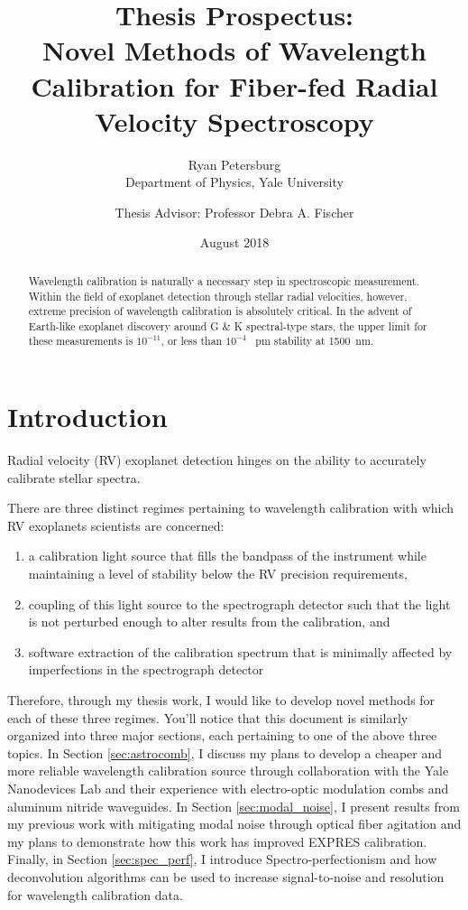 \documentclass[12pt]{article}
\title{Thesis Prospectus:\\ Novel Methods of Wavelength Calibration for Fiber-fed Radial Velocity Spectroscopy}
\author{Ryan Petersburg\\ Department of Physics, Yale University
\and Thesis Advisor: Professor Debra A. Fischer}
\date{August 2018}
\begin{document}
\maketitle

\begin{abstract}

Wavelength calibration is naturally a necessary step in spectroscopic measurement. Within the field of exoplanet detection through stellar radial velocities, however, extreme precision of wavelength calibration is absolutely critical. In the advent of Earth-like exoplanet discovery around G \& K spectral-type stars, the upper limit for these measurements is $10^{-11}$, or less than $10^{-4}$ \SI{}{\pico\meter} stability at \SI{1500}{\nano\meter}.

\end{abstract}

\pagebreak

\section{Introduction}

Radial velocity (RV) exoplanet detection hinges on the ability to accurately calibrate stellar spectra.

There are three distinct regimes pertaining to wavelength calibration with which RV exoplanets scientists are concerned:
\begin{enumerate}
    \item a calibration light source that fills the bandpass of the instrument while maintaining a level of stability below the RV precision requirements,
    \item coupling of this light source to the spectrograph detector such that the light is not perturbed enough to alter results from the calibration, and
    \item software extraction of the calibration spectrum that is minimally affected by imperfections in the spectrograph detector
\end{enumerate}

Therefore, through my thesis work, I would like to develop novel methods for each of these three regimes. You'll notice that this document is similarly organized into three major sections, each pertaining to one of the above three topics. In Section \ref{sec:astrocomb}, I discuss my plans to develop a cheaper and more reliable wavelength calibration source through collaboration with the Yale Nanodevices Lab and their experience with electro-optic modulation combs and aluminum nitride waveguides. In Section \ref{sec:modal_noise}, I present results from my previous work with mitigating modal noise through optical fiber agitation and my plans to demonstrate how this work has improved EXPRES calibration. Finally, in Section \ref{sec:spec_perf}, I introduce Spectro-perfectionism and how deconvolution algorithms can be used to increase signal-to-noise and resolution for wavelength calibration data.
\end{document}
